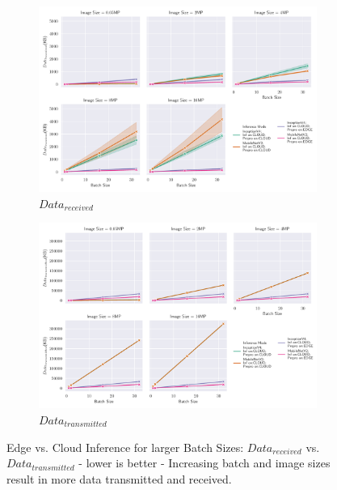 \begin{figure}[!htb]
\centering
\begin{subfigure}[b]{0.95\textwidth}
   \includegraphics[width=1\linewidth]{./Bilder/single_plots/batch_size_plots/Effects_of_Batch_size_Received_Data.pdf}
   \caption{$Data_{received}$}
   \label{fig:BatchSizeReceivedData} 
\end{subfigure}

\begin{subfigure}[b]{0.95\textwidth}
   \includegraphics[width=1\linewidth]{./Bilder/single_plots/batch_size_plots/Effects_of_Batch_size_Transmitted_Data.pdf}
   \caption{$Data_{transmitted}$}
   \label{fig:BatchSizeTransmittedData}
\end{subfigure}

\caption{Edge vs.  Cloud Inference for larger Batch Sizes:  $Data_{received}$ vs. $Data_{transmitted}$ - lower is better - Increasing batch and image sizes result in more data transmitted and received.}
\end{figure}


